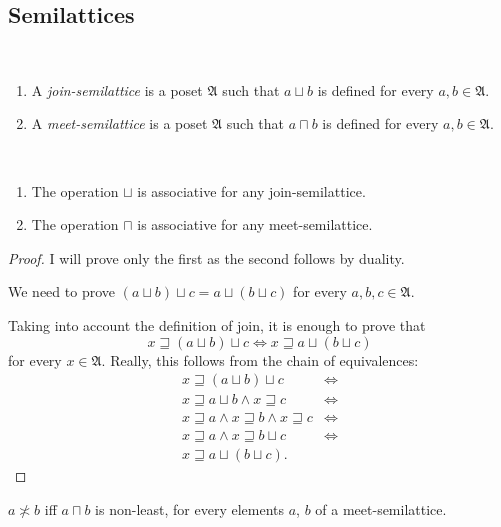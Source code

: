 \subsection{Semilattices}
\begin{defn}
~
\begin{enumerate}
\item {}A \emph{join-semilattice} is
a poset $\mathfrak{A}$ such that $a\sqcup b$ is defined for every
$a,b\in\mathfrak{A}$.
\item {}A \emph{meet-semilattice} is
a poset $\mathfrak{A}$ such that $a\sqcap b$ is defined for every
$a,b\in\mathfrak{A}$.
\end{enumerate}
\end{defn}
\begin{thm}
~
\begin{enumerate}
\item The operation $\sqcup$ is associative for any join-semilattice.
\item The operation $\sqcap$ is associative for any meet-semilattice.
\end{enumerate}
\end{thm}
\begin{proof}
I will prove only the first as the second follows by duality.

We need to prove $(a\sqcup b)\sqcup c=a\sqcup(b\sqcup c)$ for every
$a,b,c\in\mathfrak{A}$.

Taking into account the definition of join, it is enough to prove
that
\[
x\sqsupseteq(a\sqcup b)\sqcup c\Leftrightarrow x\sqsupseteq a\sqcup(b\sqcup c)
\]
for every $x\in\mathfrak{A}$. Really, this follows from the chain
of equivalences:
\begin{align*}
x\sqsupseteq(a\sqcup b)\sqcup c & \Leftrightarrow\\
x\sqsupseteq a\sqcup b\land x\sqsupseteq c & \Leftrightarrow\\
x\sqsupseteq a\land x\sqsupseteq b\land x\sqsupseteq c & \Leftrightarrow\\
x\sqsupseteq a\land x\sqsupseteq b\sqcup c & \Leftrightarrow\\
x\sqsupseteq a\sqcup(b\sqcup c).
\end{align*}
\end{proof}
\begin{obvious}
$a\nasymp b$ iff $a\sqcap b$ is non-least, for every elements $a$,
$b$ of a meet-semilattice.
\end{obvious}

